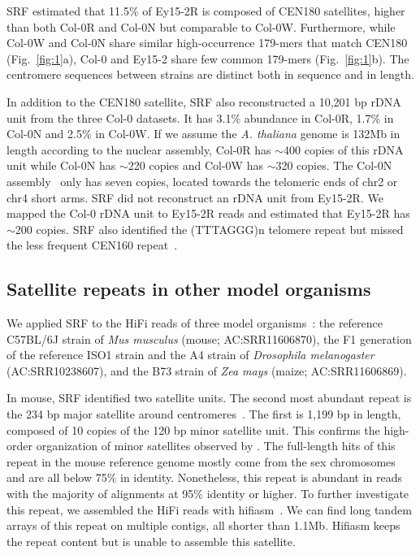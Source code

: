 \documentclass{bioinfo}
\newcommand{\revised}[1]{{\color{blue}#1}}
\begin{document}
SRF estimated that 11.5\% of Ey15-2R is composed of CEN180 satellites, higher
than both Col-0R and Col-0N \revised{but comparable to Col-0W}. Furthermore, while Col-0W and Col-0N share similar
high-occurrence 179-mers that match CEN180 (Fig.~\ref{fig:1}a), Col-0 and
Ey15-2 share few common 179-mers (Fig.~\ref{fig:1}b). The centromere sequences
between strains are distinct both in sequence and in length.

In addition to the CEN180 satellite, SRF also reconstructed a \revised{10,201 bp} rDNA
unit from the \revised{three} Col-0 datasets. It has 3.1\% abundance in Col-0R, 1.7\% in
Col-0N \revised{and 2.5\% in Col-0W}. If we assume the \emph{A. thaliana} genome is 132Mb in length
according to the nuclear assembly, Col-0R has $\sim$400 copies of this rDNA unit
while Col-0N has $\sim$220 copies \revised{and Col-0W has $\sim$320 copies}. The Col-0N assembly~\citep{Naish:2021aa} only has seven copies,
located towards the telomeric ends of chr2 or chr4 short arms.  SRF did not
reconstruct an rDNA unit from Ey15-2R. We mapped the Col-0 rDNA unit to Ey15-2R
reads and estimated that Ey15-2R has $\sim$200 copies. \revised{SRF also
identified the (TTTAGGG)n telomere repeat but missed the less frequent
CEN160 repeat~\citep{Round:1997aa}.}

\subsection{Satellite repeats in other model organisms}

We applied SRF to the HiFi reads of three model organisms~\citep{Hon:2020aa}: the
reference C57BL/6J strain of \emph{Mus musculus} (mouse; AC:SRR11606870), the
F1 generation of the reference ISO1 strain and the A4 strain of
\emph{Drosophila melanogaster} (AC:SRR10238607), and the B73 strain of \emph{Zea
mays} (maize; AC:SRR11606869).

In mouse, SRF identified two satellite units. The second most abundant repeat
is the 234 bp major satellite around
centromeres~\citep{Arora:2021aa,Thakur:2021aa}. The first is 1,199 bp in length,
composed of 10 copies of the 120 bp minor satellite unit. This confirms the
high-order organization of minor satellites observed by \citet{Pertile:2009aa}.
The full-length hits of this repeat in the mouse reference genome mostly come
from the sex chromosomes and are all below 75\% in identity.  Nonetheless, this
repeat is abundant in reads with the majority of alignments at 95\% identity or
higher. To further investigate this repeat, we assembled the HiFi reads with
hifiasm~\citep{Cheng:2021aa}. We can find long tandem arrays of this repeat on
multiple contigs, all shorter than 1.1Mb.  Hifiasm keeps the repeat content but
is unable to assemble this satellite.
\end{document}
